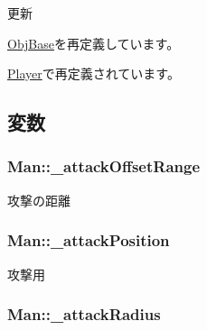 更新 



\hyperlink{class_obj_base_a83992aba2dcaf6d3548dd17618b4b0b9}{Obj\-Base}を再定義しています。



\hyperlink{class_player_a05b60cac1922c5be5c1be16baffa4497}{Player}で再定義されています。



\subsection{変数}
\hypertarget{class_man_aef1a7ce26d3f34dc162e49a392df1088}{
\subsubsection[{\-\_\-attack\-Offset\-Range}]{ Man\-::\-\_\-attack\-Offset\-Range\hspace{0.3cm}{\ttfamily [protected]}}}\label{class_man_aef1a7ce26d3f34dc162e49a392df1088}


攻撃の距離 

\hypertarget{class_man_a0df920254c02bae445db9f3a896e3986}{
\subsubsection[{\-\_\-attack\-Position}]{ Man\-::\-\_\-attack\-Position\hspace{0.3cm}{\ttfamily [protected]}}}\label{class_man_a0df920254c02bae445db9f3a896e3986}


攻撃用 

\hypertarget{class_man_a132be4c780976f644274832498b3e84e}{
\subsubsection[{\-\_\-attack\-Radius}]{ Man\-::\-\_\-attack\-Radius\hspace{0.3cm}{\ttfamily [protected]}}}\label{class_man_a132be4c780976f644274832498b3e84e}


